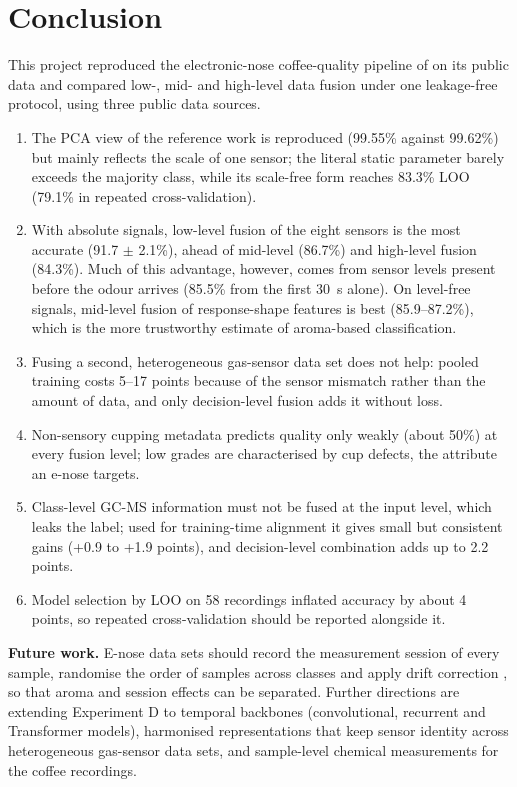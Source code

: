\section{Conclusion}
\label{sec:conclusion}

This project reproduced the electronic-nose coffee-quality pipeline of \cite{rodriguez2010electronic} on its public data and compared low-, mid- and high-level data fusion under one leakage-free protocol, using three public data sources.
\begin{enumerate}
\item The PCA view of the reference work is reproduced (99.55\% against 99.62\%) but mainly reflects the scale of one sensor; the literal static parameter barely exceeds the majority class, while its scale-free form reaches 83.3\% LOO (79.1\% in repeated cross-validation).
\item With absolute signals, low-level fusion of the eight sensors is the most accurate (91.7 $\pm$ 2.1\%), ahead of mid-level (86.7\%) and high-level fusion (84.3\%). Much of this advantage, however, comes from sensor levels present before the odour arrives (85.5\% from the first 30~s alone). On level-free signals, mid-level fusion of response-shape features is best (85.9--87.2\%), which is the more trustworthy estimate of aroma-based classification.
\item Fusing a second, heterogeneous gas-sensor data set does not help: pooled training costs 5--17 points because of the sensor mismatch rather than the amount of data, and only decision-level fusion adds it without loss.
\item Non-sensory cupping metadata predicts quality only weakly (about 50\%) at every fusion level; low grades are characterised by cup defects, the attribute an e-nose targets.
\item Class-level GC-MS information must not be fused at the input level, which leaks the label; used for training-time alignment it gives small but consistent gains (+0.9 to +1.9 points), and decision-level combination adds up to 2.2 points.
\item Model selection by LOO on 58 recordings inflated accuracy by about 4 points, so repeated cross-validation should be reported alongside it.
\end{enumerate}

\textbf{Future work.} E-nose data sets should record the measurement session of every sample, randomise the order of samples across classes and apply drift correction \cite{vergara2012chemical}, so that aroma and session effects can be separated. Further directions are extending Experiment D to temporal backbones (convolutional, recurrent and Transformer models), harmonised representations that keep sensor identity across heterogeneous gas-sensor data sets, and sample-level chemical measurements for the coffee recordings.
\clearpage

